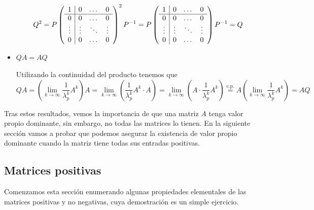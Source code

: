 \documentclass[size=a4, parskip=half, titlepage=false, toc=flat, toc=bib, 12pt]{scrartcl}
\makeatletter
\renewenvironment{proof}[1][\proofname] {\par\pushQED{\qed}\normalfont\topsep6\p@\@plus6\p@\relax\trivlist\item[\hskip\labelsep\itshape\tgpaella#1\@addpunct{.}]\ignorespaces}{\popQED\endtrivlist\@endpefalse}
\theoremstyle{theorem-style}
\theoremstyle{definition-style}
\theoremstyle{remark-style}
\theoremstyle{example-style}
\theoremstyle{definition-style}
\theoremstyle{remark-style}
\renewcommand{\proofname}{\normalfont\tgpaella\bfseries\small DEMOSTRACIÓN}
\makeatother
\begin{document}
\begin{proof}
\begin{itemize}
$$Q^2 = P \left(
      \begin{array}{{c|ccc}}
            1         &    0      &   \dots    & 0\\\hline
            0         &    0       &    \dots    & 0 \\
            \vdots    &    \vdots  &  \ddots &  \vdots \\
           0          &     0       &    \dots    & 0
      \end{array}   \right)^2 P^{-1} = P \left(
            \begin{array}{{c|ccc}}
                  1         &    0      &   \dots    & 0\\\hline
                  0         &    0       &    \dots    & 0 \\
                  \vdots    &    \vdots  &  \ddots &  \vdots \\
                 0          &     0       &    \dots    & 0
            \end{array}   \right) P^{-1} = Q $$
\item $QA = AQ$

Utilizando la continuidad del producto tenemos que
$$QA = (\lim_{k \to \infty} \frac{1}{\lambda_p^k} A^k)A = \lim_{k \to \infty} (\frac{1}{\lambda_p^k} A^k \cdot A) = \lim_{k \to \infty} (A \cdot \frac{1}{\lambda_p^k} A^k) \overset{\textrm{c.p.}} = A ( \lim_{k \to \infty} \frac{1}{\lambda_p^k} A^k) = AQ$$

\end{itemize}
\end{proof}

Tras estos resultados, vemos la importancia de que una matriz $A$ tenga valor propio dominante, sin embargo, no todas las matrices lo tienen. En la siguiente sección vamos a probar que podemos asegurar la existencia de valor propio dominante cuando la matriz tiene todas sus entradas positivas.

\subsection{Matrices positivas}

Comenzamos esta sección enumerando algunas propiedades elementales de las matrices positivas y no negativas, cuya demostración es un simple ejercicio.
\end{document}
